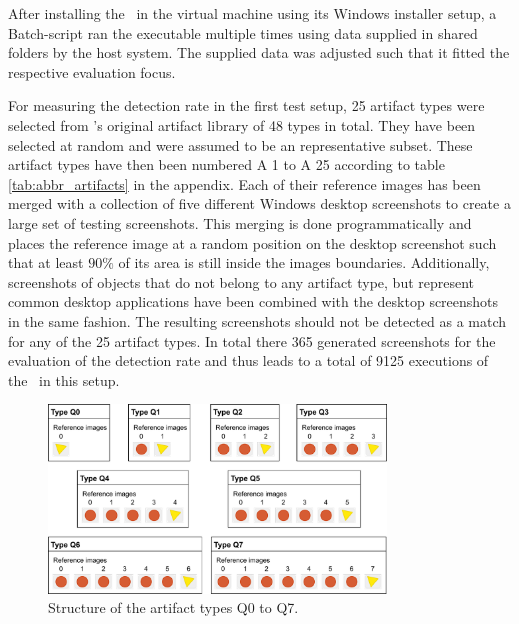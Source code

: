 After installing the \vd~in the virtual machine using its Windows installer setup, a Batch-script ran the executable multiple times using data supplied in shared folders by the host system. The supplied data was adjusted such that it fitted the respective evaluation focus.

For measuring the detection rate in the first test setup, 25 artifact types were selected from \ape's original artifact library of 48 types in total. They have been selected at random and were assumed to be an representative subset. These artifact types have then been numbered A 1 to A 25 according to table \ref{tab:abbr_artifacts} in the appendix. Each of their reference images has been merged with a collection of five different Windows desktop screenshots to create a large set of testing screenshots. This merging is done programmatically and places the reference image at a random position on the desktop screenshot such that at least $90\%$ of its area is still inside the images boundaries. Additionally, screenshots of objects that do not belong to any artifact type, but represent common desktop applications have been combined with the desktop screenshots in the same fashion. The resulting screenshots should not be detected as a match for any of the 25 artifact types. In total there 365 generated screenshots for the evaluation of the detection rate and thus leads to a total of 9125 executions of the \vd~in this setup.

\begin{figure}[h]
	\centering
	\includegraphics[width=0.8\textwidth]{fig/artifact_types_t2}
	\caption{Structure of the artifact types Q0 to Q7.}\label{fig:arttypes-q0q7}
\end{figure}

